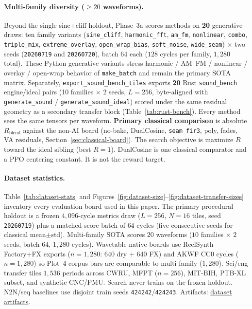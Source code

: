 \paragraph{Multi-family diversity ($\ge 20$ waveforms).}
Beyond the single sine{+}cliff holdout, Phase~3a scores methods on \textbf{20} generative draws: ten family variants (\texttt{sine\_cliff}, \texttt{harmonic\_fft}, \texttt{am\_fm}, \texttt{nonlinear}, \texttt{combo}, \texttt{triple\_mix}, \texttt{extreme\_overlay}, \texttt{open\_wrap\_bias}, \texttt{soft\_noise}, \texttt{wide\_seam}) $\times$ two seeds (\texttt{20260719} and \texttt{20260720}), batch 64 each ($128$ cycles per family, $1{,}280$ total).
These Python generative variants stress harmonic / AM--FM / nonlinear / overlay / open-wrap behavior of \texttt{make\_batch} and remain the primary SOTA matrix.
Separately, \texttt{export\_sound\_bench\_tiles} exports \textbf{20} Rust \texttt{sound\_bench} engine/ideal pairs (10 families $\times$ 2 seeds, $L{=}256$, byte-aligned with \texttt{generate\_sound} / \texttt{generate\_sound\_ideal}) scored under the same residual geometry as a secondary transfer block (Table~\ref{tab:rust-bench}).
Every method sees the same tensors per waveform.
\textbf{Primary classical comparison} is absolute $R_{\mathrm{blend}}$ against the non-AI board (no-bake, DualCosine, \texttt{seam\_fir3}, poly, fades, VA residuals, Section~\ref{sec:classical-board}).
The search objective is maximize $R$ toward the ideal sibling (best $R{=}1$).
DualCosine is one classical comparator and a PPO centering constant.
It is not the reward target.

\paragraph{Dataset statistics.}
Table~\ref{tab:dataset-stats} and Figures~\ref{fig:dataset-size}--\ref{fig:dataset-transfer-sizes} inventory every evaluation board used in this paper.
The primary procedural holdout is a frozen $4{,}096$-cycle metrics draw ($L{=}256$, $N{=}16$ tiles, seed \texttt{20260719}) plus a matched score batch of $64$ cycles (five consecutive seeds for classical mean$\pm$std).
Multi-family SOTA scores $20$ waveforms ($10$ families $\times$ $2$ seeds, batch $64$, $1{,}280$ cycles).
Wavetable-native boards use ReelSynth Factory+FX exports ($n{=}1{,}280$: $640$ dry + $640$ FX) and AKWF CC0 cycles ($n{=}1{,}280$) so Plot~4 corpus bars are comparable to multi-family ($1{,}280$).
Sci/eng transfer tiles $1{,}536$ periods across CWRU, MFPT ($n{=}256$), MIT-BIH, PTB-XL subset, and synthetic CNC/PMU.
Search never trains on the frozen holdout. N2N/seq baselines use disjoint train seeds \texttt{424242}/\texttt{424243}.
Artifacts: \href{https://github.com/reeldemo/denoise-opt-meta/tree/master/paper/Unsupervised_Wavetable_Seam_Artifact_Repair_via_Hybrid_GA-PPO_Meta-Search_v11/figures}{dataset artifacts}.

